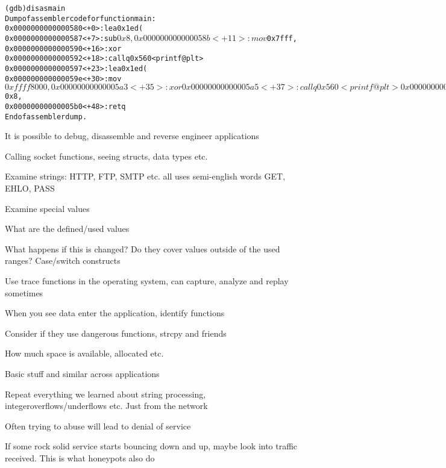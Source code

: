 \documentclass[Screen16to9,17pt]{foils}
\begin{document}

\begin{alltt}\footnotesize
  (gdb) disas main
  Dump of assembler code for function main:
     0x0000000000000580 <+0>:	lea    0x1ed(%rip),%rdi        # 0x774
     0x0000000000000587 <+7>:	sub    $0x8,%rsp
     0x000000000000058b <+11>:	mov    $0x7fff,%esi
     0x0000000000000590 <+16>:	xor    %eax,%eax
     0x0000000000000592 <+18>:	callq  0x560 <printf@plt>
     0x0000000000000597 <+23>:	lea    0x1ed(%rip),%rdi        # 0x78b
     0x000000000000059e <+30>:	mov    $0xffff8000,%esi
     0x00000000000005a3 <+35>:	xor    %eax,%eax
     0x00000000000005a5 <+37>:	callq  0x560 <printf@plt>
     0x00000000000005aa <+42>:	xor    %eax,%eax
     0x00000000000005ac <+44>:	add    $0x8,%rsp
     0x00000000000005b0 <+48>:	retq
  End of assembler dump.
\end{alltt}

\begin{list2}
\item It is possible to debug, disassemble and reverse engineer applications
\item Calling socket functions, seeing structs, data types etc.
\item Examine strings: HTTP, FTP, SMTP etc. all uses semi-english words GET, EHLO, PASS
\end{list2}



\begin{list2}
\item Examine special values
\item What are the defined/used values
\item What happens if this is changed? Do they cover values outside of the used ranges? Case/switch constructs
\item Use trace functions in the operating system, can capture, analyze and replay sometimes
\end{list2}



\begin{list2}
\item When you see data enter the application, identify functions
\item Consider if they use dangerous functions, strcpy and friends
\item How much space is available, allocated etc.
\item Basic stuff and similar across applications
\vskip 2cm
\item Repeat everything we learned about string processing, integeroverflows/underflows etc. Just from the network
\item Often trying to abuse will lead to denial of service
\vskip 1cm
\item If some rock solid service starts bouncing down and up, maybe look into traffic received. This is what honeypots also do
\end{list2}
\end{document}
